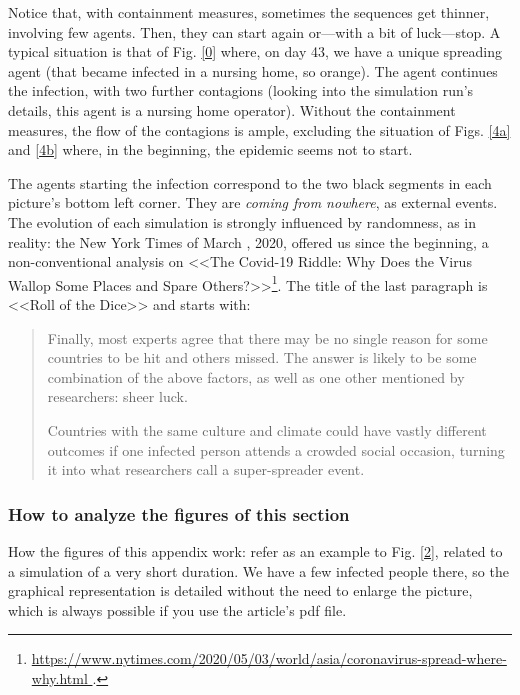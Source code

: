 \documentclass[11pt]{article}
\begin{document}
Notice that, with containment measures, sometimes the sequences get thinner, involving few agents. 
Then, they can start again or---with a bit of luck---stop. A typical situation is that of Fig. \ref{0} where, on day 43, we have a unique spreading agent (that became infected in a nursing home, so orange). The agent continues the infection, with two further contagions (looking into the simulation run's details, this agent is a nursing home operator). Without the containment measures, the flow of the contagions is ample, excluding the situation of Figs. \ref{4a} and \ref{4b} where, in the beginning, the epidemic seems not to start.

The agents starting the infection correspond to the two black segments in each picture's bottom left corner. They are  \emph{coming from nowhere}, as external events. The evolution of each simulation is strongly influenced by randomness, as in reality: the New York Times of March , 2020, offered us since the beginning, a non-conventional analysis on <<The Covid-19 Riddle: Why Does the Virus Wallop Some Places and Spare Others?>>\footnote{\url{https://www.nytimes.com/2020/05/03/world/asia/coronavirus-spread-where-why.html }.}. The title of the last paragraph is <<Roll of the Dice>> and starts with:

\begin{quote}
Finally, most experts agree that there may be no single reason for some countries to be hit and others missed. The answer is likely to be some combination of the above factors, as well as one other mentioned by researchers: sheer luck.

Countries with the same culture and climate could have vastly different outcomes if one infected person attends a crowded social occasion, turning it into what researchers call a super-spreader event.
\end{quote}

\subsubsection{How to analyze the figures of this section}
\label{howToAnalyze}

How the figures of this appendix work: refer as an example to Fig. \ref{2}, related to a simulation of a very short duration. We have a few infected people there, so the graphical representation is detailed without the need to enlarge the picture, which is always possible if you use the article's pdf file.
\end{document}
